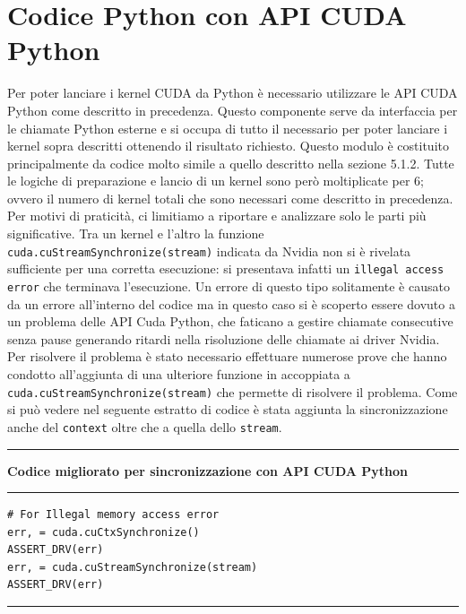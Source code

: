 \documentclass[12pt,a4paper]{report}
\begin{document}
{\section{Codice Python con API CUDA Python}
Per poter lanciare i kernel CUDA da Python è necessario utilizzare le API CUDA Python come descritto in precedenza. \newline
Questo componente serve da interfaccia per le chiamate Python esterne e si occupa di tutto il necessario per poter lanciare i kernel sopra descritti ottenendo il risultato richiesto. \newline
Questo modulo è costituito principalmente da codice molto simile a quello descritto nella sezione 5.1.2. Tutte le logiche di preparazione e lancio di un kernel sono però moltiplicate per 6; ovvero il numero di kernel totali che sono necessari come descritto in precedenza. \newline
Per motivi di praticità, ci limitiamo a riportare e analizzare solo le parti più significative. \newline \newline
Tra un kernel e l'altro la funzione \verb|cuda.cuStreamSynchronize(stream)| indicata da Nvidia non si è rivelata sufficiente per una corretta esecuzione: si presentava infatti un \verb|illegal access error| che terminava l'esecuzione. Un errore di questo tipo solitamente è causato da un errore all'interno del codice ma in questo caso si è scoperto essere dovuto a un problema delle API Cuda Python, che faticano a gestire chiamate consecutive senza pause generando ritardi nella risoluzione delle chiamate ai driver Nvidia.
Per risolvere il problema è stato necessario effettuare numerose prove che hanno condotto all'aggiunta di una ulteriore funzione in accoppiata a \verb|cuda.cuStreamSynchronize(stream)| che permette di risolvere il problema. Come si può vedere nel seguente estratto di codice è stata aggiunta la sincronizzazione anche del \verb|context| oltre che a quella dello \verb|stream|. \\[10pt]
\noindent\rule[0.5ex]{\linewidth}{2pt}
\small{\textbf{Codice migliorato per sincronizzazione con API CUDA Python}} \\
\noindent\rule[0.5ex]{\linewidth}{1pt}
\begin{lstlisting}
# For Illegal memory access error
err, = cuda.cuCtxSynchronize()
ASSERT_DRV(err)
err, = cuda.cuStreamSynchronize(stream)
ASSERT_DRV(err)
\end{lstlisting}
\noindent\rule[0.5ex]{\linewidth}{1pt} \\[10pt]

}
\end{document}
